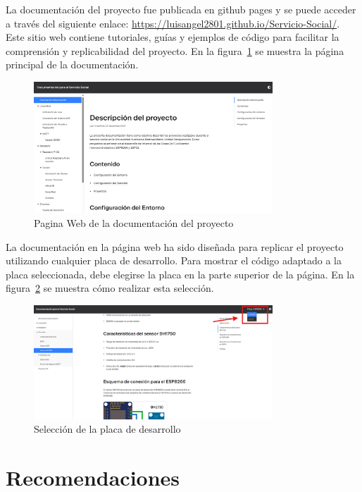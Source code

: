 La documentación del proyecto fue publicada en github pages y se puede acceder a través del siguiente enlace: \url{https://luisangel2801.github.io/Servicio-Social/}. Este sitio web contiene tutoriales, guías y ejemplos de código para facilitar la comprensión y replicabilidad del proyecto. En la figura~\ref{fig:paginaWeb} se muestra la página principal de la documentación.

\begin{figure}[H]
    \centering
    \includegraphics[width=0.8\textwidth]{img/paginaWeb.png}
    \caption{Pagina Web de la documentación del proyecto}
    \label{fig:paginaWeb}
\end{figure}

La documentación en la página web ha sido diseñada para replicar el proyecto utilizando cualquier placa de desarrollo. Para mostrar el código adaptado a la placa seleccionada, debe elegirse la placa en la parte superior de la página. En la figura~\ref{fig:placa} se muestra cómo realizar esta selección.

\begin{figure}[H]
    \centering
    \includegraphics[width=0.8\textwidth]{img/paginaWeb_placa.png}
    \caption{Selección de la placa de desarrollo}
    \label{fig:placa}
\end{figure}

\section{Recomendaciones}


